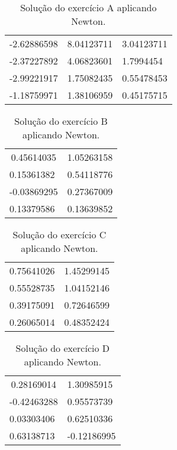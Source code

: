 \documentclass[12pt]{article}
\begin{document}
\begin{table}[!ht]
    \centering
\begin{tabular}{|lll|}
\multicolumn{1}{|c}{-2.62886598} & 8.04123711 & 3.04123711 \\
-2.37227892                      & 4.06823601 & 1.7994454  \\
-2.99221917                      & 1.75082435 & 0.55478453 \\
-1.18759971                      & 1.38106959 & 0.45175715
\end{tabular}
    \caption{Solução do exercício A aplicando Newton.}
\end{table}

\begin{table}[!ht]
    \centering
\begin{tabular}{|ll|}
\multicolumn{1}{|c}{0.45614035} & 1.05263158 \\
0.15361382                      & 0.54118776 \\
-0.03869295                     & 0.27367009 \\
0.13379586                      & 0.13639852
\end{tabular}
    \caption{Solução do exercício B aplicando Newton.}
\end{table}

\begin{table}[!h]
    \centering
\begin{tabular}{|ll|}
\multicolumn{1}{|c}{0.75641026} & 1.45299145 \\
0.55528735                      & 1.04152146 \\
0.39175091                      & 0.72646599 \\
0.26065014                      & 0.48352424
\end{tabular}
    \caption{Solução do exercício C aplicando Newton.}
\end{table}

\begin{table}[!h]
    \centering
\begin{tabular}{|ll|}
\multicolumn{1}{|c}{0.28169014} & 1.30985915  \\
-0.42463288                     & 0.95573739  \\
0.03303406                      & 0.62510336  \\
0.63138713                      & -0.12186995
\end{tabular}
    \caption{Solução do exercício D aplicando Newton.}
\end{table}
\end{document}
